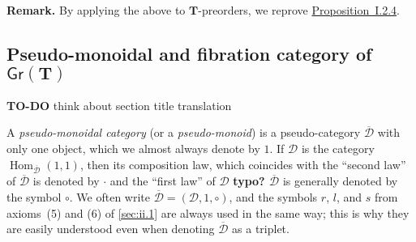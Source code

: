 \documentclass[fleqn]{article}
\newenvironment{rmenv}[1]
  {\phantomsection\par\medskip\noindent\textbf{#1.}\rmfamily}
  {\par\medskip}
\newcommand{\oldpage}[1]{\marginpar{\footnotesize$\Big\vert$ \textit{p.~#1}}}
\newcommand{\todo}{{\color{purple}\textbf{TO-DO }}}
\newcommand{\unsure}[1]{{\color{purple}\textbf{#1}}}
\newcommand{\TT}{\mathbf{T}}
\newcommand{\cat}[1]{\mathcal{#1}}
\newcommand{\Cat}[1]{\mathsf{#1}}
\newcommand{\Gr}[1]{\Cat{Gr}(#1)}
\DeclareMathOperator{\Hom}{Hom}
\begin{document}
\oldpage{262}

\begin{rmenv}{Remark}
  By applying the above to $\TT$-preorders, we reprove \hyperref[proposition:i.2.4]{Proposition~I.2.4}.
\end{rmenv}



\subsection{Pseudo-monoidal and fibration category of $\Gr{\TT}$}
\label{sec:ii.4}

\todo{think about section title translation}

A \emph{pseudo-monoidal category} (or a \emph{pseudo-monoid}) is a pseudo-category $\overline{\cat{D}}$ with only one object, which we almost always denote by $1$.
If $\cat{D}$ is the category $\Hom_{\overline{\cat{D}}}(1,1)$, then its composition law, which coincides with the ``second law'' of $\overline{\cat{D}}$ is denoted by $\cdot$ and the ``first law'' of $\cat{D}$ \unsure{typo? $\overline{\cat{D}}$} is generally denoted by the symbol $\circ$.
We often write $\overline{\cat{D}}=(\cat{D},1,\circ)$, and the symbols $r$, $l$, and $s$ from axioms~(5) and (6) of \cref{sec:ii.1} are always used in the same way;
this is why they are easily understood even when denoting $\overline{\cat{D}}$ as a triplet.






\nocite{*}
\printbibliography[heading=bibintoc,title=Bibliography]
\end{document}
